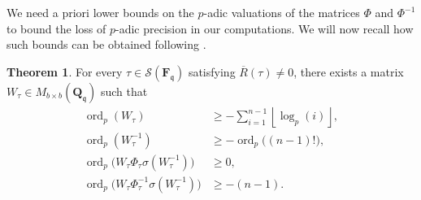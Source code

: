 \documentclass[a4paper,11pt]{article}
\numberwithin{equation}{section}
\providecommand{\floor}[1]{\left\lfloor#1\right\rfloor}   %
\newcommand{\QQ}{\mathbf{Q}} %
\newcommand{\FF}{\mathbf{F}} %
\DeclareMathOperator{\ord}{ord}          %
\theoremstyle{definition}
\newtheorem{thm}{Theorem}[section]
\begin{document}
We need a priori lower bounds on the $p$-adic valuations of the matrices $\Phi$ and 
$\Phi^{-1}$ to bound the loss of $p$-adic precision in our computations. We will now
recall how such bounds can be obtained following \cite{AbbottKedlayaRoe2006}.

\begin{thm} \label{thm:deltabound}
For every 
$\tau \in \mathcal{S}(\FF_{\mathfrak{q}})$ satisfying $\overline{R}(\tau) \neq 0$, there exists a 
matrix $W_{\tau} \in M_{b \times b}(\QQ_{\mathfrak{q}})$ such that 
\begin{align*}
\ord_p(W_{\tau}) & \geq -\sum_{i=1}^{n-1} \floor{\log_p(i)}, \\
\ord_p(W_{\tau}^{-1}) & \geq -\ord_p\bigl((n-1)!\bigr), \\
\ord_p\bigl(W_{\tau} \Phi_{\tau} \sigma(W_{\tau}^{-1})\bigr) & \geq 0, \\
\ord_p\bigl(W_{\tau} \Phi_{\tau}^{-1} \sigma(W_{\tau}^{-1})\bigr) & \geq -(n-1).
\end{align*}
\end{thm}
\end{document}
